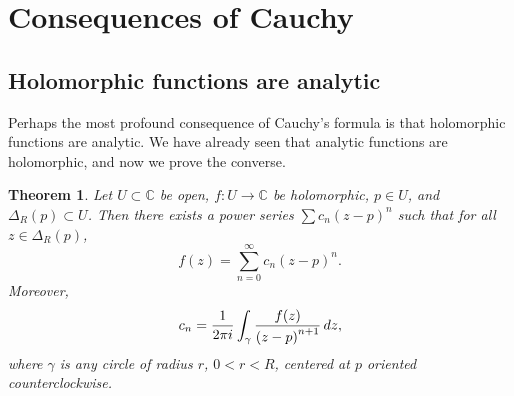 \documentclass[12pt,openany]{book}
\newcommand{\avoidbreak}{\postdisplaypenalty=100}
\newcommand{\C}{{\mathbb{C}}}
\theoremstyle{plain}
\newtheorem{thm}{Theorem}[section]
\theoremstyle{remark}
\theoremstyle{definition}
\theoremstyle{exercise}
\theoremstyle{example}
\begin{document}

\section{Consequences of Cauchy}
\label{sec:consequencescauchy}

\subsection{Holomorphic functions are analytic}

Perhaps the most profound consequence of Cauchy's formula is
that holomorphic functions are analytic.  We have already seen
that analytic functions are holomorphic, and now we prove the converse.

\begin{thm} \label{thm:holpower}
Let $U \subset \C$ be open, $f \colon U \to \C$ be
holomorphic, $p \in U$, and $\Delta_R(p) \subset U$.
Then there exists a power series $\sum c_n {(z-p)}^n$
such that for all $z \in \Delta_R(p)$,
\begin{equation*}
f(z) = \sum_{n=0}^\infty c_n {(z-p)}^n .
\end{equation*}
Moreover,
\begin{equation*}
c_n = 
\frac{1}{2\pi i}
\int_{\gamma}
\frac{f(z)}{{(z-p)}^{n+1}}
\,
dz  ,
\avoidbreak
\end{equation*}
where $\gamma$ is any circle of radius $r$, $0 < r < R$, centered at
$p$ oriented counterclockwise.
\end{thm}
\end{document}
